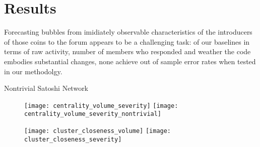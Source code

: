 \section{Results}

Forecasting bubbles from imidiately observable characteristics of the introducers of those coins to the forum appears to be a challenging task: of our baselines in terms of raw activity, number of members who responded and weather the code embodies substantial changes, none achieve out of sample error rates when tested in our methodolgy.

Nontrivial Satoshi Network

\begin{figure}[h]
\texttt{[image: centrality\_volume\_severity]}
\texttt{[image: centrality\_volume\_severity\_nontrivial]}
\end{figure}


\begin{figure}[h]
\texttt{[image: cluster\_closeness\_volume]}
\texttt{[image: cluster\_closeness\_severity]}
\end{figure}
